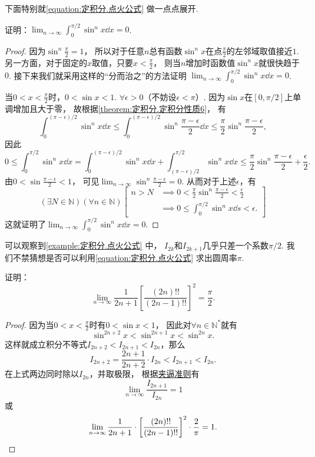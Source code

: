 下面特别就\cref{equation:定积分.点火公式} 做一点点展开.
\begin{example}
证明：\(\lim_{n\to\infty} \int_0^{\pi/2} \sin^n x \dd{x} = 0\).
\begin{proof}
因为\(\sin^n\frac{\pi}{2}=1\)，
所以对于任意\(n\)总有函数\(\sin^n x\)在点\(\frac{\pi}{2}\)的左邻域取值接近\(1\).
另一方面，对于固定的\(x\)取值，只要\(x<\frac{\pi}{2}\)，
则当\(n\)增加时函数值\(\sin^n x\)就很快趋于\(0\).
接下来我们就采用这样的“分而治之”的方法证明
\(\lim_{n\to\infty} \int_0^{\pi/2} \sin^n x \dd{x} = 0\).

当\(0<x<\frac{\pi}{2}\)时，\(0<\sin x<1\).
\(\forall\epsilon>0\)（不妨设\(\epsilon<\pi\)）.
因为\(\sin x\)在\([0,\pi/2]\)上单调增加且大于零，
故根据\cref{theorem:定积分.定积分性质6}，
有\[
	\int_0^{(\pi-\epsilon)/2} \sin^n x \dd{x}
	\leq
	\int_0^{(\pi-\epsilon)/2} \sin^n\frac{\pi-\epsilon}{2} \dd{x}
	\leq
	\frac{\pi}{2} \sin^n\frac{\pi-\epsilon}{2},
\]
因此\[
	0 \leq \int_0^{\pi/2} \sin^n x \dd{x}
	= \int_0^{(\pi-\epsilon)/2} \sin^n x \dd{x}
	+ \int_{(\pi-\epsilon)/2}^{\pi/2} \sin^n x \dd{x}
	\leq \frac{\pi}{2} \sin^n\frac{\pi-\epsilon}{2} + \frac{\epsilon}{2}.
\]
由\(0<\sin\frac{\pi-\epsilon}{2}<1\)，
可见\(\lim_{n\to\infty} \sin^n\frac{\pi-\epsilon}{2} = 0\).
从而对于上述\(\epsilon\)，有\[
	(\exists N\in\mathbb{N})
	(\forall n\in\mathbb{N})
	\left[
		\begin{array}{ll}
			n>N
			&\implies
			0<\frac{\pi}{2} \sin^n\frac{\pi-\epsilon}{2}<\frac{\epsilon}{2} \\
			&\implies
			0 \leq \int_0^{\pi/2} \sin^n x \dd{s} < \epsilon.
		\end{array}
	\right]
\]
这就证明了\(\lim_{n\to\infty} \int_0^{\pi/2} \sin^n x \dd{x} = 0\).
\end{proof}
\end{example}

可以观察到\cref{example:定积分.点火公式} 中，
\(I_{2k}\)和\(I_{2k+1}\)几乎只差一个系数\(\pi/2\).
我们不禁猜想是否可以利用\cref{equation:定积分.点火公式} 求出圆周率\(\pi\).
\begin{example}[沃利斯公式]
证明：\begin{equation}\label{equation:定积分.沃利斯公式}
	\lim_{n\to\infty} \frac{1}{2n+1} \left[
		\frac{(2n)!!}{(2n-1)!!}
	\right]^2
	= \frac{\pi}{2}.
\end{equation}
\begin{proof}
因为当\(0<x<\frac{\pi}{2}\)时有\(0<\sin x<1\)，
因此对\(\forall n\in\mathbb{N}^*\)就有\[
	\sin^{2n+2} x < \sin^{2n+1} x < \sin^{2n} x.
\]
这样就成立积分不等式\(I_{2n+2} < I_{2n+1} < I_{2n}\)，那么\[
	I_{2n+2} = \frac{2n+1}{2n+2} \cdot I_{2n}
	< I_{2n+1} < I_{2n}.
\]
在上式两边同时除以\(I_{2n}\)，并取极限，
根据\hyperref[theorem:极限.夹逼准则]{夹逼准则}有\[
	\lim_{n\to\infty} \frac{I_{2n+1}}{I_{2n}} = 1
\]
或\[
	\lim_{n\to\infty} \frac{1}{2n+1} \cdot \left[
		\frac{(2n)!!}{(2n-1)!!}
	\right]^2 \cdot \frac{2}{\pi}
	= 1.
	\qedhere
\]
\end{proof}
\end{example}

